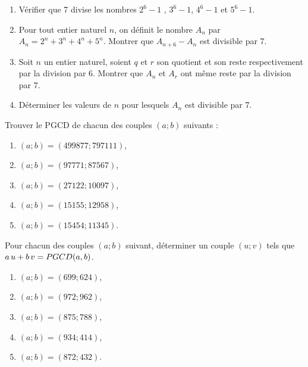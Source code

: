 %
\begin{exo}
      \begin{enumerate}
            \item V\'erifier que 7 divise les nombres $2^6 -1$ , $3^6 - 1$, $4^6 - 1$ et $5^6 - 1$.
            \item Pour tout entier naturel $n$, on d\'efinit le nombre $A_n$ par $A_n = 2^n + 3^n + 4^n + 5^n$.
                  Montrer que $A_{n+6} - A_n$ est divisible par 7.
            \item Soit $n$ un entier naturel, soient $q$ et $r$ son quotient et son reste respectivement par la division par 6.
                  Montrer que $A_n$ et $A_r$ ont m\^eme reste par la division par 7.
            \item D\'eterminer les valeurs de $n$ pour lesquels $A_n$ est divisible par 7.
      \end{enumerate}
\end{exo}
\begin{exo}
      Trouver le PGCD de chacun des couples $(a;b)$ suivants :
      \begin{enumerate}
            \item $(a;b) = (499877;797111)$,
            \item $(a;b) = (97771;87567)$,
            \item $(a;b) = (27122;10097)$,
            \item $(a;b) = (15155;12958) $,
            \item $(a;b) = (15454;11345) $.
      \end{enumerate}
\end{exo}
%
\begin{exo}
      Pour chacun des couples $(a;b)$ suivant, d\'eterminer un couple $(u;v)$ tels que
      $a\,u + b\,v = PGCD(a,b)$.
      \begin{enumerate}
            \item $(a;b) = (699 ; 624)$,
            \item $(a;b) = (972 ; 962)$,
            \item $(a;b) = (875 ; 788)$,
            \item $(a;b) = (934 ; 414)$,
            \item $(a;b) = (872 ; 432)$.
      \end{enumerate}
\end{exo}
%
